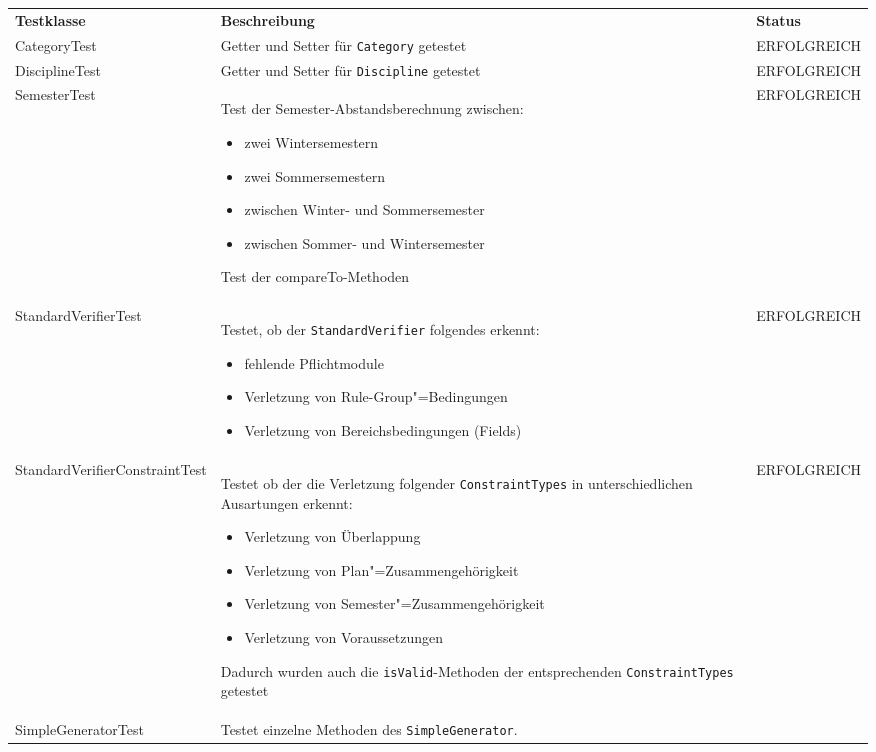 \begin{longtable}{| >{\hspace{0pt}} p{} | >{\hspace{0pt}} p{} | >{\hspace{0pt}} p{} |}
	\hline
	\textbf{Testklasse} & \textbf{Beschreibung} & \textbf{Status} \\ 
	\hhline{|=|=|=|}  
	\endfirsthead
	\endhead
	CategoryTest & Getter und Setter für \texttt{Category} getestet & ERFOLGREICH \\
	\hline
	DisciplineTest & Getter und Setter für \texttt{Discipline} getestet & ERFOLGREICH \\
	\hline
	SemesterTest & Test der Semester-Abstandsberechnung zwischen:
	\begin{itemize}
		\item zwei Wintersemestern
		\item zwei Sommersemestern
		\item zwischen Winter- und Sommersemester
		\item zwischen Sommer- und Wintersemester
	\end{itemize}
	Test der compareTo-Methoden & ERFOLGREICH \\
	\hline
	StandardVerifierTest & Testet, ob der \texttt{StandardVerifier} folgendes erkennt:
	\begin{itemize}
		\item fehlende Pflichtmodule
		\item Verletzung von Rule-Group"=Bedingungen
		\item Verletzung von Bereichsbedingungen (Fields)
	\end{itemize} & ERFOLGREICH \\
	\hline
	StandardVerifierConstraintTest & Testet ob der die Verletzung folgender \texttt{ConstraintTypes} in unterschiedlichen Ausartungen erkennt:
	\begin{itemize}
		\item Verletzung von Überlappung 
		\item Verletzung von Plan"=Zusammengehörigkeit 
		\item Verletzung von Semester"=Zusammengehörigkeit 
		\item Verletzung von Voraussetzungen
	\end{itemize}
	Dadurch wurden auch die \texttt{isValid}-Methoden der entsprechenden \texttt{ConstraintTypes} getestet & ERFOLGREICH \\
	\hline
		SimpleGeneratorTest & Testet einzelne Methoden des \texttt{SimpleGenerator}. 

\end{longtable}
